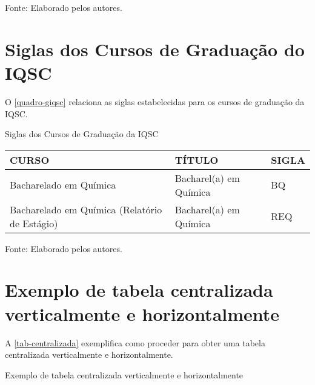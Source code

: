 \begin{apendicesenv}
\begin{quadro}[htb]
\begin{tabular}{|p{6.5cm}|p{6.5cm}|p{1.75cm}|}
	\end{tabular}
	\begin{flushleft}
		Fonte: Elaborado pelos autores.\
	\end{flushleft}
\end{quadro}

\chapter{Siglas dos Cursos de Graduação do IQSC}
O \autoref{quadro-giqsc} relaciona as siglas estabelecidas para os cursos de graduação da IQSC.
\begin{quadro}[htb]
	\ABNTEXfontereduzida
	\caption[Siglas dos Cursos de Graduação da IQSC]{Siglas dos Cursos de Graduação da IQSC}
	\label{quadro-giqsc}
	\begin{tabular}{|p{6.5cm}|p{6.5cm}|p{1.75cm}|}
		\hline
		\textbf{CURSO} & \textbf{TÍTULO} &  \textbf{SIGLA}  \\
		\hline
		Bacharelado em Química & Bacharel(a) em Química & BQ\\
		Bacharelado em Química (Relatório de Est\'agio)  & Bacharel(a) em Química & REQ\\
		\hline
		
	\end{tabular}
	\begin{flushleft}
		Fonte: Elaborado pelos autores.\
	\end{flushleft}
\end{quadro}

\chapter{Exemplo de tabela centralizada verticalmente e horizontalmente}
\index{tabelas}A \autoref{tab-centralizada} exemplifica como proceder para obter uma tabela centralizada verticalmente e horizontalmente.
\begin{table}[htb]
\ABNTEXfontereduzida
\caption[Exemplo de tabela centralizada verticalmente e horizontalmente]{Exemplo de tabela centralizada verticalmente e horizontalmente}
\label{tab-centralizada}


\end{table}
\end{apendicesenv}
